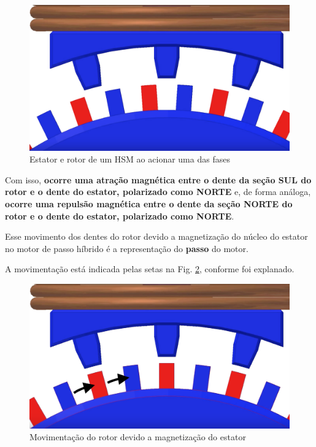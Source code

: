 	\begin{figure}[H]
		\centering 
		\includegraphics[scale=0.16]{images/hsm_operation/visaopasso2}
		\caption{Estator e rotor de um HSM ao acionar uma das fases}
		\label{passo2}
	\end{figure}
	
	Com isso, \textbf{ocorre uma atração magnética entre o dente da seção SUL do rotor e o dente do estator, polarizado como NORTE} e, de forma análoga, \textbf{ocorre uma repulsão magnética entre o dente da seção NORTE do rotor e o dente do estator, polarizado como NORTE}.
	
	Esse movimento dos dentes do rotor devido a magnetização do núcleo do estator no motor de passo híbrido é a representação do \textbf{passo} do motor.
	
	A movimentação está indicada pelas setas na Fig. \ref{passo3}, conforme foi explanado.
	
	\begin{figure}[H]
		\centering 
		\includegraphics[scale=0.16]{images/hsm_operation/visaopasso3}
		\caption{Movimentação do rotor devido a magnetização do estator}
		\label{passo3}
	\end{figure}  
	
